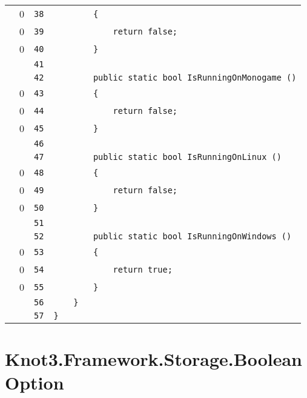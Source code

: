 \documentclass[a4paper,10pt]{article}
\begin{document}
\begin{longtable}[l]{lrrl}
\cellcolor{red} & 0 & \verb~38~ & \verb~        {~\\
\cellcolor{red} & 0 & \verb~39~ & \verb~            return false;~\\
\cellcolor{red} & 0 & \verb~40~ & \verb~        }~\\
\cellcolor{gray} &  & \verb~41~ & \verb~~\\
\cellcolor{gray} &  & \verb~42~ & \verb~        public static bool IsRunningOnMonogame ()~\\
\cellcolor{red} & 0 & \verb~43~ & \verb~        {~\\
\cellcolor{red} & 0 & \verb~44~ & \verb~            return false;~\\
\cellcolor{red} & 0 & \verb~45~ & \verb~        }~\\
\cellcolor{gray} &  & \verb~46~ & \verb~~\\
\cellcolor{gray} &  & \verb~47~ & \verb~        public static bool IsRunningOnLinux ()~\\
\cellcolor{red} & 0 & \verb~48~ & \verb~        {~\\
\cellcolor{red} & 0 & \verb~49~ & \verb~            return false;~\\
\cellcolor{red} & 0 & \verb~50~ & \verb~        }~\\
\cellcolor{gray} &  & \verb~51~ & \verb~~\\
\cellcolor{gray} &  & \verb~52~ & \verb~        public static bool IsRunningOnWindows ()~\\
\cellcolor{red} & 0 & \verb~53~ & \verb~        {~\\
\cellcolor{red} & 0 & \verb~54~ & \verb~            return true;~\\
\cellcolor{red} & 0 & \verb~55~ & \verb~        }~\\
\cellcolor{gray} &  & \verb~56~ & \verb~    }~\\
\cellcolor{gray} &  & \verb~57~ & \verb~}~\\
\end{longtable}
\newpage
\section{Knot3.Framework.Storage.BooleanOption}
\end{document}
